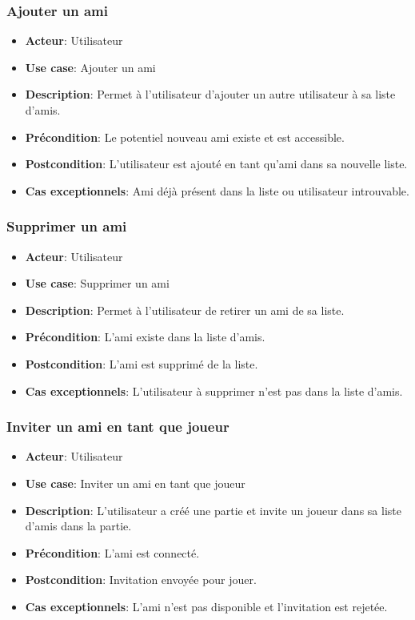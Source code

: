 \documentclass{article}
\begin{document}
\subsubsection*{Ajouter un ami}
\begin{itemize}
    \item \textbf{Acteur}: Utilisateur
    \item \textbf{Use case}: Ajouter un ami
    \item \textbf{Description}: Permet à l'utilisateur d'ajouter un autre utilisateur à sa liste d'amis.
    \item \textbf{Précondition}: Le potentiel nouveau ami existe et est accessible.
    \item \textbf{Postcondition}: L'utilisateur est ajouté en tant qu'ami dans sa nouvelle liste.
    \item \textbf{Cas exceptionnels}: Ami déjà présent dans la liste ou utilisateur introuvable.
\end{itemize}

\subsubsection*{Supprimer un ami}
\begin{itemize}
    \item \textbf{Acteur}: Utilisateur
    \item \textbf{Use case}: Supprimer un ami
    \item \textbf{Description}: Permet à l'utilisateur de retirer un ami de sa liste.
    \item \textbf{Précondition}: L'ami existe dans la liste d'amis.
    \item \textbf{Postcondition}: L'ami est supprimé de la liste.
    \item \textbf{Cas exceptionnels}: L'utilisateur à supprimer n'est pas dans la liste d'amis.
\end{itemize}

\subsubsection*{Inviter un ami en tant que joueur}
\begin{itemize}
    \item \textbf{Acteur}: Utilisateur
    \item \textbf{Use case}: Inviter un ami en tant que joueur
    \item \textbf{Description}: L'utilisateur a créé une partie et invite un joueur dans sa liste d'amis dans la partie.
    \item \textbf{Précondition}: L'ami est connecté.
    \item \textbf{Postcondition}: Invitation envoyée pour jouer.
    \item \textbf{Cas exceptionnels}: L'ami n'est pas disponible et l'invitation est rejetée.
\end{itemize}
\end{document}
